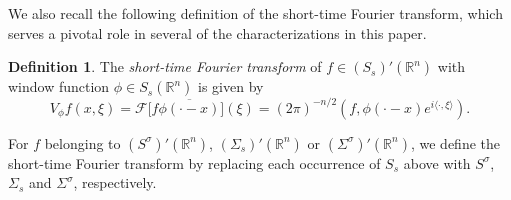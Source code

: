 \documentclass[11pt,a4paper,reqno]{amsart}
\numberwithin{equation}{section}
\theoremstyle{definition}
\theoremstyle{definition}
\newtheorem{definition}[thm]{Definition}
\begin{document}
We also recall the following definition of the short-time Fourier transform, which serves a pivotal role in several of the characterizations in this paper.
\begin{definition}
 The \emph{short-time Fourier transform} of $f\in(S_s)'(\mathbb{R}^n)$ with window function $\phi\in S_s(\mathbb{R}^n)$ is given by
\begin{equation*}
    V_\phi f(x,\xi) = \mathscr{F}\Big[ f \overline{\phi(\cdot - x)} \Big] (\xi) = (2\pi)^{-n/2}(f, \phi(\cdot-x)e^{i\langle \cdot,\xi\rangle}).
\end{equation*}

For $f$ belonging to $(S^\sigma)'(\mathbb{R}^n)$, $(\Sigma_s)'(\mathbb{R}^n)$ or $(\Sigma^\sigma)'(\mathbb{R}^n)$, we define the short-time Fourier transform by replacing each occurrence of $S_s$ above with $S^\sigma$, $\Sigma_s$ and $\Sigma^\sigma$, respectively.
\end{definition}

\end{document}
